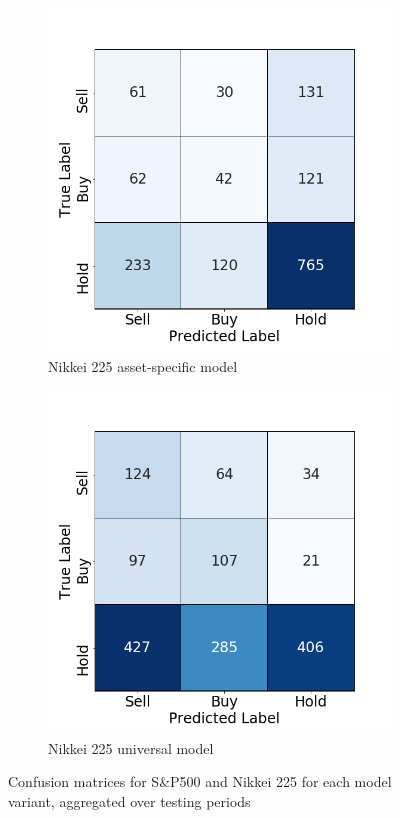 \documentclass[11pt, a4paper]{article}
\begin{document}
\begin{figure}[H]
\begin{subfigure}{.5\textwidth}
  \centering
  \includegraphics[width=.75\linewidth]{images/CMs/CM_indiv_N225.png}  
  \caption{Nikkei 225 asset-specific model}
  \label{fig:subN225I}
\end{subfigure}
\begin{subfigure}{.5\textwidth}
  \centering
  \includegraphics[width=.75\linewidth]{images/CMs/CM_univ_N225.png}  
  \caption{Nikkei 225 universal model}
  \label{fig:subN225U}
\end{subfigure}

\caption{Confusion matrices for S\&P500 and Nikkei 225 for each model variant, aggregated over testing periods}
\label{fig:AppCMs1}
\end{figure}
\end{document}
